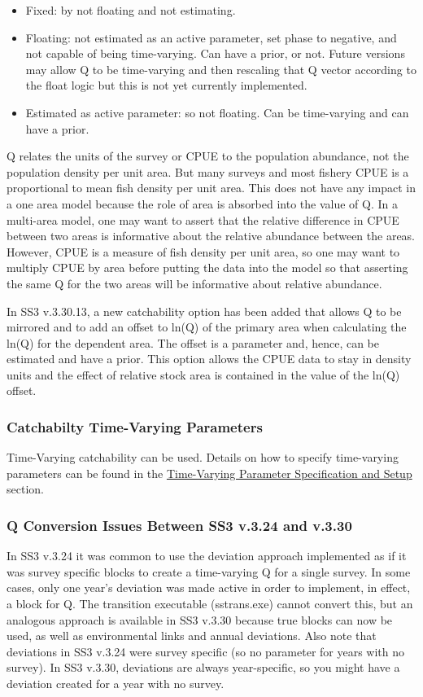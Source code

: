\begin{itemize}
	\item Fixed: by not floating and not estimating.

	\item Floating: not estimated as an active parameter, set phase to negative, and not capable of being time-varying.  Can have a prior, or not. Future versions  may allow Q to be time-varying and then rescaling that Q vector according to the float logic but this is not yet currently implemented.

	\item Estimated as active parameter: so not floating. Can be time-varying and can have a prior.
\end{itemize}


Q relates the units of the survey or CPUE to the population abundance, not the population density per unit area.  But many surveys and most fishery CPUE is a proportional to mean fish density per unit area.  This does not have any impact in a one area model because the role of area is absorbed into the value of Q.  In a multi-area model, one may want to assert that the relative difference in CPUE between two areas is informative about the relative abundance between the areas.   However, CPUE is a measure of fish density per unit area, so one may want to multiply CPUE by area before putting the data into the model so that asserting the same Q for the two areas will be informative about relative abundance.

In SS3 v.3.30.13, a new catchability option has been added that allows Q to be mirrored and to add an offset to ln(Q) of the primary area when calculating the ln(Q) for the dependent area. The offset is a parameter and, hence, can be estimated and have a prior. This option allows the CPUE data to stay in density units and the effect of relative stock area is contained in the value of the ln(Q) offset.

\subsubsection{Catchabilty Time-Varying Parameters}
Time-Varying catchability can be used. Details on how to specify time-varying parameters can be found in the \hyperlink{tvOrder}{Time-Varying Parameter Specification and Setup} section.

\subsubsection{Q Conversion Issues Between SS3 v.3.24 and v.3.30}
In SS3 v.3.24 it was common to use the deviation approach implemented as if it was survey specific blocks to create a time-varying Q for a single survey.  In some cases, only one year's deviation was made active in order to implement, in effect, a block for Q.  The transition executable (sstrans.exe) cannot convert this, but an analogous approach is available in SS3 v.3.30 because true blocks can now be used, as well as environmental links and annual deviations. Also note that deviations in SS3 v.3.24 were survey specific (so no parameter for years with no survey). In SS3 v.3.30, deviations are always year-specific, so you might have a deviation created for a year with no survey.

